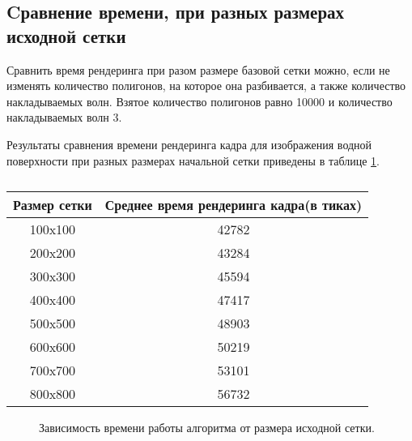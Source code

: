 \subsection{Cравнение времени, при разных размерах исходной сетки}

Сравнить время рендеринга при разом размере базовой сетки можно, если не изменять количество полигонов, на которое она разбивается, а также количество накладываемых волн. Взятое количество полигонов равно 10000 и количество накладываемых волн 3.

Результаты сравнения времени рендеринга кадра для изображения водной поверхности при разных размерах начальной сетки приведены в таблице \ref{tab:noise}.

\begin{table}[h!]
	\caption{}
	\label{tab:noise}
	\begin{center}
		\begin{tabular}{|c | c|} 
			\hline
			Размер сетки & Среднее время рендеринга кадра(в тиках) \\  
			\hline
			100x100 & 42782  \\
			\hline
			200x200 & 43284   \\
			\hline
			300x300 & 45594  \\
			\hline
			400x400 & 47417   \\
			\hline
			500x500 & 48903   \\
			\hline
			600x600 &  50219  \\
			\hline
			700x700 & 53101   \\
			\hline
			800x800 & 56732  \\
			\hline
		\end{tabular}
	\end{center}
\end{table}

\begin{figure}[h]
	\centering
	\captionsetup{justification=centering}
	\caption{Зависимость времени работы алгоритма от размера исходной сетки.}
	\label{plt:time_img}
	
\end{figure}

